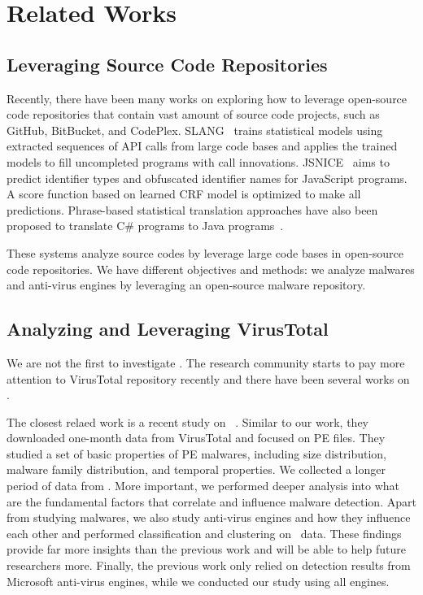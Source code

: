 \section{Related Works}
\label{sec:related}

\subsection{Leveraging Source Code Repositories}

Recently, there have been many works on exploring how to leverage open-source code repositories that contain vast amount of source code projects, 
such as GitHub, BitBucket, and CodePlex. 
SLANG~\cite{code-completion} trains statistical models using extracted sequences of API calls from large code bases
and applies the trained models to fill uncompleted programs with call innovations. 
JSNICE~\cite{big-predicting} aims to predict identifier types and obfuscated identifier names for JavaScript programs. 
A score function based on learned CRF model is optimized to make all predictions. 
Phrase-based statistical translation approaches have also been proposed
to translate C\# programs to Java programs~\citet{big-translation}. 

These systems analyze source codes by leverage large code bases in open-source code repositories.
We have different objectives and methods: 
we analyze malwares and anti-virus engines by leveraging an open-source malware repository.


\subsection{Analyzing and Leveraging VirusTotal}
We are not the first to investigate \vt.
The research community starts to pay more attention to VirusTotal repository recently
and there have been several works on \vt.

The closest relaed work is a recent study on \vt~\citet{SongAPsys2016}. 
Similar to our work, they downloaded one-month data from VirusTotal
and focused on PE files.
They studied a set of basic properties of PE malwares,
including size distribution, malware family distribution, and temporal properties.   
We collected a longer period of data from \vt.
More important, we performed deeper analysis into what are the fundamental factors 
that correlate and influence malware detection.
Apart from studying malwares, we also study anti-virus engines and how they influence each other
and performed classification and clustering on \vt\ data.
These findings provide far more insights than the previous work and will be able to help future researchers more.
Finally, the previous work only relied on detection results from Microsoft anti-virus engines,
while we conducted our study using all engines.

